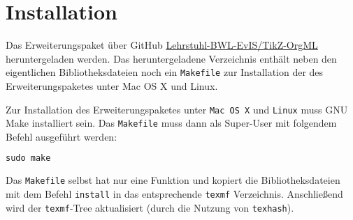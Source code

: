\section{Installation}
\label{sec:Installation}
Das Erweiterungspaket über GitHub \href{https://github.com/Lehrstuhl-BWL-EvIS/TikZ-OrgML}{Lehrstuhl-BWL-EvIS/TikZ-OrgML} heruntergeladen werden. Das heruntergeladene Verzeichnis enthält neben den eigentlichen Bibliotheksdateien noch ein \texttt{Makefile} zur Installation der des Erweiterungspaketes unter \textsf{Mac OS X} und \textsf{Linux}.\medskip

\noindent Zur Installation des Erweiterungspaketes unter \texttt{Mac OS X} und \texttt{Linux} muss \textsf{GNU Make} installiert sein.
Das \texttt{Makefile} muss dann als Super-User mit folgendem Befehl ausgeführt werden:

\begin{lstlisting}[language=C]
    sudo make
\end{lstlisting}

Das \texttt{Makefile} selbst hat nur eine Funktion und kopiert die Bibliotheksdateien mit dem Befehl \texttt{install} in das entsprechende \texttt{texmf} Verzeichnis. Anschließend wird der \texttt{texmf}-Tree aktualisiert (durch die Nutzung von \texttt{texhash}).

